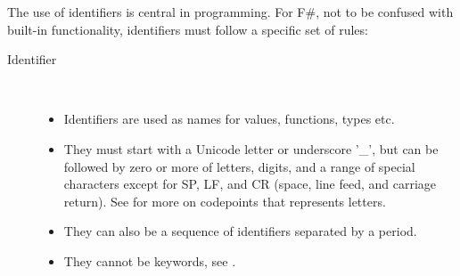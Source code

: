 \documentclass[fsharpNotes.tex]{subfiles}
\begin{document}
The use of identifiers is central in programming. For F\#, not to be confused with built-in functionality, identifiers must follow a specific set of rules: 
\begin{description} 
\item[Identifier]~\\[-5mm]
  \begin{itemize}
  \item Identifiers are used as names for values, functions, types etc.
  \item They must start with a Unicode letter or underscore '\_', but can be followed by zero or more of letters, digits, and a range of special characters except for SP, LF, and CR (space, line feed, and carriage return). See  for more on codepoints that represents letters. 
  \item They can also be a sequence of identifiers separated by a period.
  \item They cannot be keywords, see .
  \end{itemize}
\end{description}
\end{document}
